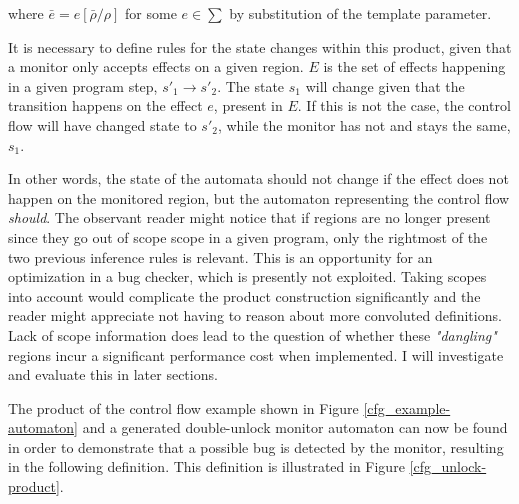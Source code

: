 \noindent where $\bar{e} = e [\bar{\rho}/\rho]$ for some $e \in \sum$ by substitution of the template parameter. 
    
\newpar It is necessary to define rules for the state changes within this product, given that a monitor only accepts effects on a given region. $E$ is the set of effects happening in a given program step, $s'_1 \rightarrow s'_2$. The state $s_1$ will change given that the transition happens on the effect $e$, present in $E$. If this is not the case, the control flow will have changed state to $s'_2$, while the monitor has not and stays the same, $s_1$. 

\newpar In other words, the state of the automata should not change if the effect does not happen on the monitored region, but the automaton representing the control flow \textit{should}. The observant reader might notice that if regions are no longer present since they go out of scope scope in a given program, only the rightmost of the two previous inference rules is relevant. This is an opportunity for an optimization in a bug checker, which is presently not exploited. Taking scopes into account would complicate the product construction significantly and the reader might appreciate not having to reason about more convoluted definitions. Lack of scope information does lead to the question of whether these \textit{"dangling"} regions incur a significant performance cost when implemented. I will investigate and evaluate this in later sections.

\newpar The product of the control flow example shown in Figure \ref{cfg_example-automaton} and a generated double-unlock monitor automaton can now be found in order to demonstrate that a possible bug is detected by the monitor, resulting in the following definition. This definition is illustrated in Figure \ref{cfg_unlock-product}. 

